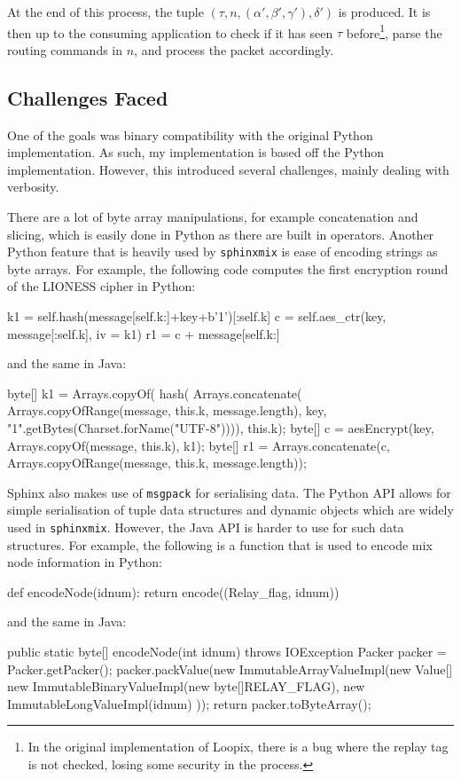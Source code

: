 \documentclass[final,dissertation.tex]{subfiles}
\begin{document}
At the end of this process, the tuple $(\tau, n, (\alpha', \beta', \gamma'), \delta')$ is produced. It is then up to the consuming application to check if it has seen $\tau$ before\footnote{In the original implementation of Loopix, there is a bug where the replay tag is not checked, losing some security in the process. }, parse the routing commands in $n$, and process the packet accordingly.

\subsection{Challenges Faced}

One of the goals was binary compatibility with the original Python implementation. As such, my implementation is based off the Python implementation. However, this introduced several challenges, mainly dealing with verbosity.

There are a lot of byte array manipulations, for example concatenation and slicing, which is easily done in Python as there are built in operators. Another Python feature that is heavily used by \verb|sphinxmix| is ease of encoding strings as byte arrays. For example, the following code computes the first encryption round of the LIONESS cipher in Python:

\begin{pythoncode}
k1 = self.hash(message[self.k:]+key+b'1')[:self.k]
c = self.aes_ctr(key, message[:self.k], iv = k1)
r1 = c + message[self.k:]
\end{pythoncode}
and the same in Java:
\begin{javacode}
byte[] k1 = Arrays.copyOf(
    hash(
        Arrays.concatenate(
            Arrays.copyOfRange(message, this.k, message.length), 
            key, 
            "1".getBytes(Charset.forName("UTF-8")))), 
        this.k);
byte[] c = aesEncrypt(key, Arrays.copyOf(message, this.k), k1);
byte[] r1 = Arrays.concatenate(c, 
    Arrays.copyOfRange(message, this.k, message.length));
\end{javacode}

Sphinx also makes use of \verb|msgpack| for serialising data. The Python API allows for simple serialisation of tuple data structures and dynamic objects which are widely used in \verb|sphinxmix|. However, the Java API is harder to use for such data structures. For example, the following is a function that is used to encode mix node information in Python:

\begin{pythoncode}
def encodeNode(idnum):
    return encode((Relay_flag, idnum))
\end{pythoncode}
and the same in Java:
\begin{javacode}
public static byte[] encodeNode(int idnum) throws IOException {
    Packer packer = Packer.getPacker();
    packer.packValue(new ImmutableArrayValueImpl(new Value[] {
        new ImmutableBinaryValueImpl(new byte[]{RELAY_FLAG}),
        new ImmutableLongValueImpl(idnum)
    }));
    return packer.toByteArray();
}
\end{javacode}
\end{document}
